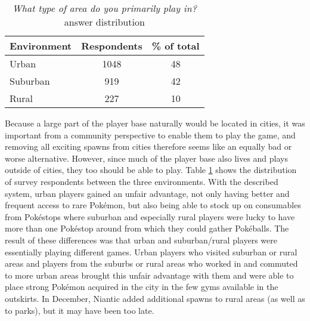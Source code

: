 \begin{table}[h]
	\centering
	\caption{\emph{What type of area do you primarily play in?} answer distribution}
	\label{tbl:urban-level-distribution}
	\begin{tabular}{|l|c|c|}
		\hline
		\textbf{Environment} & \textbf{Respondents} & \textbf{\% of total}\\\hline\hline
		Urban & 1048 & 48\\\hline
		Suburban & 919 & 42\\\hline
		Rural & 227 & 10\\\hline
	\end{tabular}
\end{table}

Because a large part of the player base naturally would be located in cities, it was important from a community perspective to enable them to play the game, and removing all exciting spawns from cities therefore seems like an equally bad or worse alternative. However, since much of the player base also lives and plays outside of cities, they too should be able to play. Table \ref{tbl:urban-level-distribution} shows the distribution of survey respondents between the three environments. With the described system, urban players gained an unfair advantage, not only having better and frequent access to rare Pokémon, but also being able to stock up on consumables from Pokéstops where suburban and especially rural players were lucky to have more than one Pokéstop around from which they could gather Pokéballs. The result of these differences was that urban and suburban/rural players were essentially playing different games. Urban players who visited suburban or rural areas and players from the suburbs or rural areas who worked in and commuted to more urban areas brought this unfair advantage with them and were able to place strong Pokémon acquired in the city in the few gyms available in the outskirts. In December, Niantic added additional spawns to rural areas (as well as to parks), but it may have been too late. 


